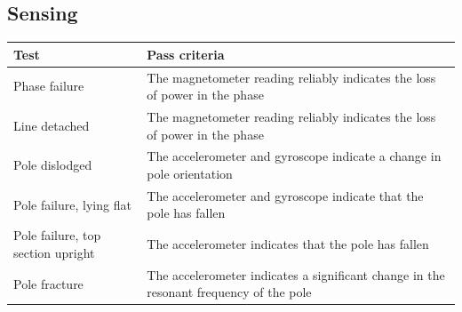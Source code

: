 \documentclass[12pt]{article}
\begin{document}
\subsection{Sensing}
\begin{center}
  \begin{table}[!htb]
    
    \hskip-2.2cm\begin{tabular}{|p{8cm}|p{10cm}|}
        \hline
        \textbf{Test} & \textbf{Pass criteria} \\
        \hline

        Phase failure & The magnetometer reading reliably indicates the loss of power in the phase\\[0.3cm]
        Line detached & The magnetometer reading reliably indicates the loss of power in the phase\\[0.3cm]
        Pole dislodged & The accelerometer and gyroscope indicate a change in pole orientation\\[0.3cm]
        Pole failure, lying flat & The accelerometer and gyroscope indicate that the pole has fallen\\[0.3cm]
        Pole failure, top section upright & The accelerometer indicates that the pole has fallen\\[0.3cm]
        Pole fracture & The accelerometer indicates a significant change in the resonant frequency of the pole \\[0.3cm]

        \hline

      \end{tabular}    
      
      \label{tab:summary_measurments}
     \end{table}
  \end{center}
\end{document}
